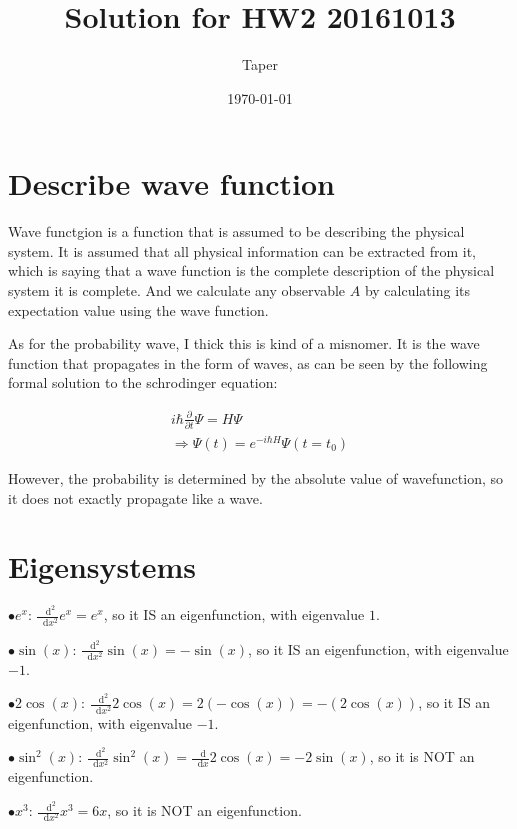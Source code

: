 \documentclass{article}
\title{Solution for HW2 20161013}
\date{\today}
\author{Taper}
\newcommand*\diff{\mathop{}\!\mathrm{d}}
\numberwithin{equation}{subsection} %
\theoremstyle{definition}
\begin{document}
\maketitle
{}
\section{Describe wave function}
Wave functgion is a function that is assumed to be describing the
physical system. It is assumed that all physical information can be
extracted from it, which is saying that a wave function is the
complete description of the physical system it is complete. And we
calculate any observable $A$ by calculating its expectation value
using the wave function.

As for the probability wave, I thick this is kind of a misnomer. It is
the wave function that propagates in the form of waves, as can be seen
by the following formal solution to the schrodinger equation:

\begin{align}
    i\hbar \frac{\partial}{\partial t} \Psi = H \Psi \nonumber\\
    \Rightarrow \Psi(t) = e^{-i\hbar H} \Psi(t=t_0)
\end{align}

However, the probability is determined by the absolute value of
wavefunction, so it does not exactly propagate like a wave. 

\section{Eigensystems}

$\bullet e^x$: $\frac{\diff^2}{\diff x^2} e^x = e^x$, so it IS an
eigenfunction, with eigenvalue $1$.

$\bullet \sin(x)$: $\frac{\diff^2}{\diff x^2} \sin(x) = -\sin(x)$, so
it IS an eigenfunction, with eigenvalue $-1$.

$\bullet 2\cos(x)$: $\frac{\diff^2}{\diff x^2} 2\cos(x) = 2
(-\cos(x)) = - (2\cos(x))$, so it IS an eigenfunction, with eigenvalue
$-1$.

$\bullet \sin^2(x)$: $\frac{\diff^2}{\diff x^2} \sin^2(x) =
\frac{\diff}{\diff x}2 \cos(x) = -2 \sin(x)$, so it is NOT an
eigenfunction.

$\bullet x^3$: $\frac{\diff^2}{\diff x^2} x^3 = 6x$, so it is NOT an
eigenfunction.
\end{document}
